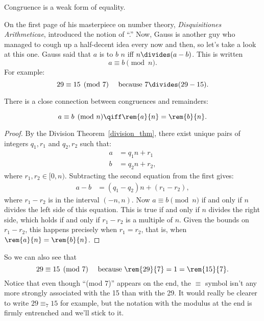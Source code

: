 \begin{editingnotes}
Congruence is a weak form of equality.
\end{editingnotes}

On the first page of his masterpiece on number theory,
\emph{Disquisitiones Arithmeticae},  introduced the notion
of ``.''  Now, Gauss is another guy who managed to
cough up a half-decent idea every now and then, so let's take a look
at this one.  Gauss said that $a$ is  to $b$
 $n$ iff $n \divides (a - b)$.  This is written
\[
a \equiv b \pmod{n}.
\]
For example:
\[
29 \equiv 15 \pmod{7} \quad\text{ because } 7 \divides (29 - 15).
\]

There is a close connection between congruences and remainders:
\begin{lemma}[Remainder]
\label{lem:conrem}
\[
a \equiv b \pmod{n} \qiff \rem{a}{n} = \rem{b}{n}.
\]
\end{lemma}

\begin{proof}
By the Division Theorem~\ref{division_thm}, there exist unique pairs
of integers $q_1, r_1$ and $q_2, r_2$ such that:
\begin{align*}
a & = q_1 n + r_1\\ b & = q_2 n + r_2,
\end{align*}
where $r_1,r_2 \in [0,n)$.  Subtracting the second equation from the
  first gives:
\begin{align*}
a - b & = (q_1 - q_2) n + (r_1 - r_2),
\end{align*}
where $r_1 - r_2$ is in the interval $(-n,n)$.  Now $a \equiv b
\pmod{n}$ if and only if $n$ divides the left side of this equation.
This is true if and only if $n$ divides the right side, which holds if
and only if $r_1 - r_2$ is a multiple of $n$.  Given the bounds on
$r_1 - r_2$, this happens precisely when $r_1 = r_2$, that is, when
$\rem{a}{n} = \rem{b}{n}$.
\end{proof}

So we can also see that
\[
29 \equiv 15 \pmod{7} \quad\text{ because } \rem{29}{7} = 1 =
\rem{15}{7}.
\]
Notice that even though ``(mod 7)'' appears on the end, the $\equiv$
symbol isn't any more strongly associated with the 15 than with the
29.  It would really be clearer to write $29 \equiv_7 15$ for example,
but the notation with the modulus at the end is firmly entrenched and
we'll stick to it.

